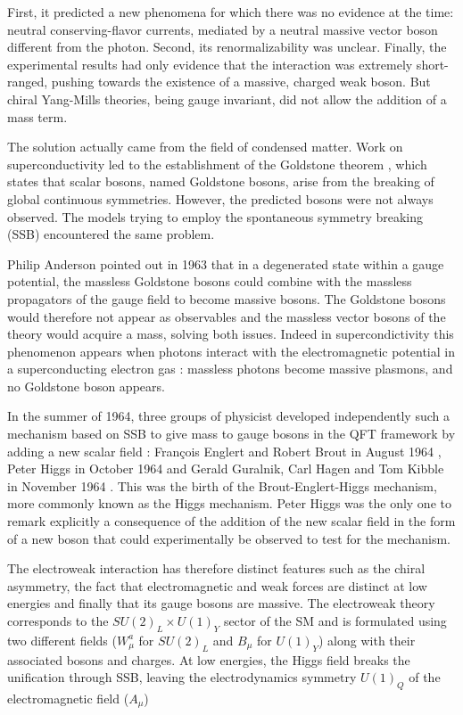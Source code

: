 First, it predicted a new phenomena for which there was no evidence at the time: neutral conserving-flavor currents, mediated by a neutral massive vector boson different from the photon. Second, its renormalizability was unclear. Finally, the experimental results had only evidence that the interaction was extremely short-ranged, pushing towards the existence of a massive, charged weak boson. But chiral Yang-Mills theories, being gauge invariant, did not allow the addition of a mass term.

The solution actually came from the field of condensed matter. Work on superconductivity led to the establishment of the Goldstone theorem \cite{PhysRev.127.965}, which states that scalar bosons, named Goldstone bosons, arise from the breaking of global continuous symmetries. However, the predicted bosons were not always observed. The models trying to employ the spontaneous symmetry breaking (SSB) encountered the same problem.

Philip Anderson pointed out in 1963 \cite{PhysRev.130.439} that in a degenerated state within a gauge potential, the massless Goldstone bosons could combine with the massless propagators of the gauge field to become massive bosons. The Goldstone bosons would therefore not appear as observables and the massless vector bosons of the theory would acquire a mass, solving both issues. Indeed in supercondictivity this phenomenon appears when photons interact with the electromagnetic potential in a superconducting electron gas : massless photons become massive plasmons, and no Goldstone boson appears.

In the summer of 1964, three groups of physicist developed independently such a mechanism based on SSB to give mass to gauge bosons in the QFT framework by adding a new scalar field : François Englert and Robert Brout in August 1964 \cite{PhysRevLett.13.321}, Peter Higgs in October 1964 \cite{HIGGS1964132,PhysRevLett.13.508} and Gerald Guralnik, Carl Hagen and Tom Kibble in November 1964 \cite{PhysRevLett.13.585}. This was the birth of the Brout-Englert-Higgs mechanism, more commonly known as the Higgs mechanism. Peter Higgs was the only one to remark explicitly a consequence of the addition of the new scalar field in the form of a new boson that could experimentally be observed to test for the mechanism. 

The electroweak interaction has therefore distinct features such as the chiral asymmetry, the fact that electromagnetic and weak forces are distinct at low energies and finally that its gauge bosons are massive. The electroweak theory corresponds to the $SU(2)_L \times U(1)_Y$ sector of the SM and is formulated using two different fields ($W_{\mu}^a$ for $SU(2)_L$ and $B_{\mu}$ for $U(1)_Y$) along with their associated bosons and charges. At low energies, the Higgs field breaks the unification through SSB, leaving the electrodynamics symmetry $U(1)_Q$ of the electromagnetic field ($A_{\mu}$)

